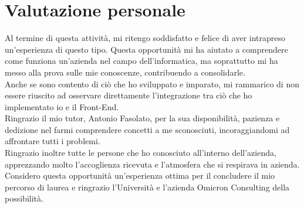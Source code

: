 \section{Valutazione personale}
Al termine di questa attività, mi ritengo soddisfatto e felice di aver intrapreso un'esperienza di questo tipo. Questa opportunità mi ha aiutato a comprendere come funziona un'azienda nel campo dell'informatica, ma soprattutto mi ha messo alla prova sulle mie conoscenze, contribuendo a consolidarle.\\
Anche se sono contento di ciò che ho sviluppato e imparato, mi rammarico di non essere riuscito ad osservare direttamente l'integrazione tra ciò che ho implementato io e il Front-End.\\
Ringrazio il mio tutor, Antonio Fasolato, per la sua disponibilità, pazienza e dedizione nel farmi comprendere concetti a me sconosciuti, incoraggiandomi ad affrontare tutti i problemi.\\
Ringrazio inoltre tutte le persone che ho conosciuto all'interno dell'azienda, apprezzando molto l'accoglienza ricevuta e l'atmosfera che si respirava in azienda.\\
Considero questa opportunità un'esperienza ottima per il concludere il mio percorso di laurea e ringrazio l'Università e l'azienda Omicron Consulting della possibilità.
